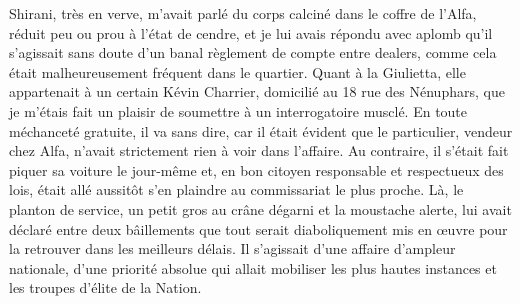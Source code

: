 Shirani, très en verve, m’avait parlé du corps calciné dans le coffre de l’Alfa, réduit peu ou prou à l’état de cendre, et je lui avais répondu avec aplomb qu’il s’agissait sans doute d’un banal règlement de compte entre dealers, comme cela était malheureusement fréquent dans le quartier. Quant à la Giulietta, elle appartenait à un certain Kévin Charrier, domicilié au 18 rue des Nénuphars, que je m’étais fait un plaisir de soumettre à un interrogatoire musclé. En toute méchanceté gratuite, il va sans dire, car il était évident que le particulier, vendeur chez Alfa, n’avait strictement rien à voir dans l’affaire. Au contraire, il s’était fait piquer sa voiture le jour-même et, en bon citoyen responsable et respectueux des lois, était allé aussitôt s’en plaindre au commissariat le plus proche. Là, le planton de service, un petit gros au crâne dégarni et la moustache alerte, lui avait déclaré entre deux bâillements que tout serait diaboliquement mis en œuvre pour la retrouver dans les meilleurs délais. Il s’agissait d’une affaire d’ampleur nationale, d’une priorité absolue qui allait mobiliser les plus hautes instances et les troupes d’élite de la Nation.

